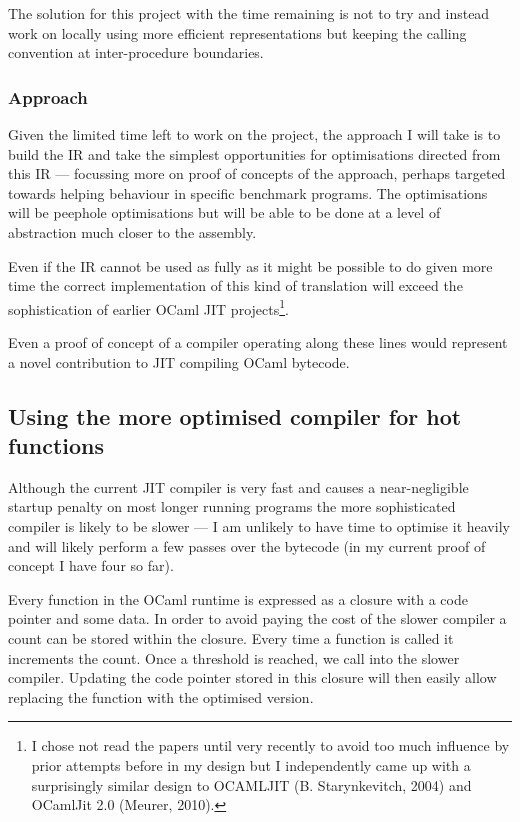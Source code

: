 \documentclass[12pt,a4paper, headings=standardclasses, parskip=on]{scrartcl}
\begin{document}
The solution for this project with the time remaining is not to try and instead work on locally using
more efficient representations but keeping the calling convention at inter-procedure boundaries.

\subsubsection*{Approach}

Given the limited time left to work on the project, the approach I will take
is to build the IR and take the simplest opportunities for optimisations
directed from this IR --- focussing more on proof of concepts of the approach,
perhaps targeted towards helping behaviour in specific benchmark programs.
The optimisations will be peephole optimisations but will be able to be done
at a level of abstraction much closer to the assembly.

Even if the IR cannot be used as fully as it might be possible to do given
more time the correct implementation of this kind of translation will exceed
the sophistication of earlier OCaml JIT projects\footnote{I chose not read
the papers until very recently to avoid too much influence by prior attempts
before in my design but I independently came up with a surprisingly similar
design to OCAMLJIT (B. Starynkevitch, 2004) and OCamlJit 2.0 (Meurer,
2010).}.

Even a proof of concept of a compiler operating along these lines would
represent a novel contribution to JIT compiling OCaml bytecode.

\subsection{Using the more optimised compiler for hot functions} \label{incr}

Although the current JIT compiler is very fast and causes a near-negligible
startup penalty on most longer running programs the more sophisticated
compiler is likely to be slower --- I am unlikely to have time to optimise it
heavily and will likely perform a few passes over the bytecode (in my current
proof of concept I have four so far).

Every function in the OCaml runtime is expressed as a closure with a code
pointer and some data. In order to avoid paying the cost of the slower
compiler a count can be stored within the closure. Every time a function is
called it increments the count. Once a threshold is reached, we call into the
slower compiler. Updating the code pointer stored in this closure will then
easily allow replacing the function with the optimised version.
\end{document}
